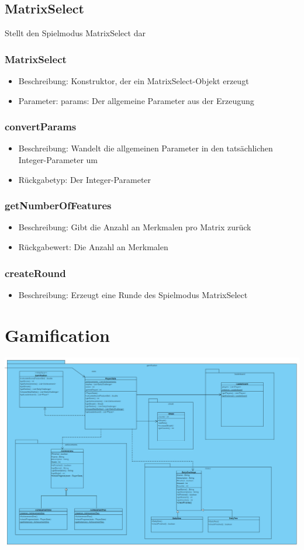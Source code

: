 \documentclass[a4paper]{scrreprt}
\begin{document}
	\subsection{MatrixSelect}
	Stellt den Spielmodus MatrixSelect dar
	\subsubsection{MatrixSelect}
		\begin{itemize}
		\item Beschreibung: Konstruktor, der ein MatrixSelect-Objekt erzeugt	
		\item Parameter: params: Der allgemeine Parameter aus der Erzeugung
		\end{itemize}
	\subsubsection{convertParams}
	\begin{itemize}
		\item Beschreibung: Wandelt die allgemeinen Parameter in den tatsächlichen Integer-Parameter um
		\item Rückgabetyp: Der Integer-Parameter
	\end{itemize}
	\subsubsection{getNumberOfFeatures}
	\begin{itemize}
		\item Beschreibung: Gibt die Anzahl an Merkmalen pro Matrix zurück
		\item Rückgabewert: Die Anzahl an Merkmalen
	\end{itemize}
	\subsubsection{createRound}
	\begin{itemize}
		\item Beschreibung: Erzeugt eine Runde des Spielmodus MatrixSelect
	\end{itemize}
	
	
	\section{Gamification}
	\includegraphics[width=\textwidth]{img/Gamification.PNG} \\
	
\end{document}
